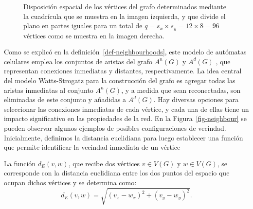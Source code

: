 \begin{figure}[!ht]
\begin{center}
\end{center}\vspace*{-0.6cm}
\caption[Disposici\'on espacial de los v\'ertices del grafo]{Disposici\'on espacial de los v\'ertices del grafo determinados mediante la cuadr\'icula que se muestra en la imagen izquierda, y que divide el plano en partes iguales para un total de $q = s_x \times s_y = 12 \times 8 = 96$ v\'ertices como se muestra en la imagen derecha.}
\label{fig-grid-2D-initial}
\end{figure}

Como se explicó en la definición~\ref{def-neighbourhoods}, este modelo de autómatas celulares emplea los conjuntos de aristas del grafo $A^n(G)$ y $A^d(G)$ , que representan conexiones inmediatas y distantes, respectivamente. La idea central del modelo Watts-Strogatz para la construcción del grafo es agregar todas las aristas inmediatas al conjunto $A^n(G)$, y a medida que sean reconectadas, son eliminadas de este conjunto y añadidas a $A^d(G)$. Hay diversas opciones para seleccionar las conexiones inmediatas de cada vértice, y cada una de ellas tiene un impacto significativo en las propiedades de la red. En la Figura~\ref{fig-neighbour} se pueden observar algunos ejemplos de posibles configuraciones de vecindad. Inicialmente, definimos la distancia euclidiana para luego establecer una función que permite identificar la vecindad inmediata de un vértice
 
\begin{definition}
\label{def-euclidean-distance}
La funci\'on $d_E(v,w)$, que recibe dos v\'ertices $v \in V(G)$ y $w \in V(G)$, se corresponde con la distancia euclidiana entre los dos puntos del espacio que ocupan dichos v\'ertices y se determina como:
\begin{equation}
d_E(v,w)=\sqrt{(v_x-w_x)^2 + (v_y-w_y)^2}.
\end{equation}
\end{definition}


